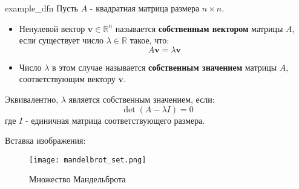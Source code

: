 \newpage
\begin{dfn}{example_dfn}
Пусть $A$ - квадратная матрица размера $n \times n$.

\begin{itemize}
\item Ненулевой вектор $\mathbf{v} \in \mathbb{R}^n$ называется \textbf{собственным вектором} матрицы $A$, если существует число $\lambda \in \mathbb{R}$ такое, что:
$$ A\mathbf{v} = \lambda\mathbf{v} $$

\item Число $\lambda$ в этом случае называется \textbf{собственным значением} матрицы $A$, соответствующим вектору $\mathbf{v}$.
\end{itemize}

Эквивалентно, $\lambda$ является собственным значением, если:
\begin{equation*}
\det(A - \lambda I) = 0
\end{equation*}
где $I$ - единичная матрица соответствующего размера.
\end{dfn}{}

Вставка изображения:

\begin{figure}[h]
\texttt{[image: mandelbrot\_set.png]}
\centering
\caption{Множество Мандельброта}
\end{figure}
